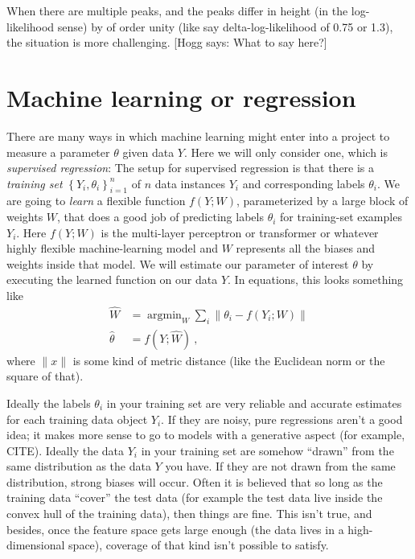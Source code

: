 \documentclass{article}
\newcommand{\setof}[1]{\left\{{#1}\right\}}
\newcommand{\norm}[1]{\lVert{#1}\rVert}
\DeclareMathOperator*{\argmin}{argmin}
\newcommand{\hogg}[1]{{\color{blue}[Hogg says: {#1}]}}
\begin{document}
When there are multiple peaks, and the peaks differ in height (in the log-likelihood sense) by of order unity (like say delta-log-likelihood of 0.75 or 1.3), the situation is more challenging.
\hogg{What to say here?}

\section{Machine learning or regression}\label{sec:ml}
There are many ways in which machine learning might enter into a project to measure a parameter $\theta$ given data $Y$.
Here we will only consider one, which is \emph{supervised regression}:
The setup for supervised regression is that there is a \emph{training set} $\setof{Y_i, \theta_i}_{i=1}^n$ of $n$ data instances $Y_i$ and corresponding labels $\theta_i$.
We are going to \emph{learn} a flexible function $f(Y;W)$, parameterized by a large block of weights $W$, that does a good job of predicting labels $\theta_i$ for training-set examples $Y_i$.
Here $f(Y;W)$ is the multi-layer perceptron or transformer or whatever highly flexible machine-learning model and $W$ represents all the biases and weights inside that model.
We will estimate our parameter of interest $\theta$ by executing the learned function on our data $Y$.
In equations, this looks something like
\begin{align}
    \hat{W} &= \argmin_W \sum_i\norm{\theta_i - f(Y_i;W)} \\
    \hat{\theta} &= f(Y;\hat{W}) ~,
\end{align}
where $\norm{x}$ is some kind of metric distance (like the Euclidean norm or the square of that).

Ideally the labels $\theta_i$ in your training set are very reliable and accurate estimates for each training data object $Y_i$.
If they are noisy, pure regressions aren't a good idea; it makes more sense to go to models with a generative aspect (for example, CITE).
Ideally the data $Y_i$ in your training set are somehow ``drawn'' from the same distribution as the data $Y$ you have.
If they are not drawn from the same distribution, strong biases will occur.
Often it is believed that so long as the training data ``cover'' the test data (for example the test data live inside the convex hull of the training data), then things are fine.
This isn't true, and besides, once the feature space gets large enough (the data lives in a high-dimensional space), coverage of that kind isn't possible to satisfy.
\end{document}
